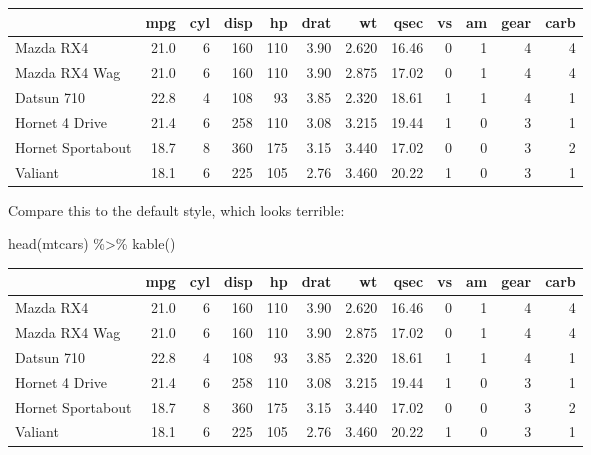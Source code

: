 \documentclass[a4paper, nobind]{templates/ociamthesis}
\newenvironment{Shaded}{\begin{snugshade}}{\end{snugshade}}
\newcommand{\FunctionTok}[1]{\textcolor[rgb]{0.00,0.00,0.00}{#1}}
\newcommand{\NormalTok}[1]{#1}
\newcommand{\SpecialCharTok}[1]{\textcolor[rgb]{0.00,0.00,0.00}{#1}}
\renewenvironment{Shaded}
{
  \vspace{10pt}%
  \begin{snugshade}%
}{%
  \end{snugshade}%
  \vspace{8pt}%
}
\begin{document}
\begin{tabular}{lrrrrrrrrrrr}
\toprule
  & mpg & cyl & disp & hp & drat & wt & qsec & vs & am & gear & carb\\
\midrule
Mazda RX4 & 21.0 & 6 & 160 & 110 & 3.90 & 2.620 & 16.46 & 0 & 1 & 4 & 4\\
Mazda RX4 Wag & 21.0 & 6 & 160 & 110 & 3.90 & 2.875 & 17.02 & 0 & 1 & 4 & 4\\
Datsun 710 & 22.8 & 4 & 108 & 93 & 3.85 & 2.320 & 18.61 & 1 & 1 & 4 & 1\\
Hornet 4 Drive & 21.4 & 6 & 258 & 110 & 3.08 & 3.215 & 19.44 & 1 & 0 & 3 & 1\\
Hornet Sportabout & 18.7 & 8 & 360 & 175 & 3.15 & 3.440 & 17.02 & 0 & 0 & 3 & 2\\
\addlinespace
Valiant & 18.1 & 6 & 225 & 105 & 2.76 & 3.460 & 20.22 & 1 & 0 & 3 & 1\\
\bottomrule
\end{tabular}

\vspace{4mm}

Compare this to the default style, which looks terrible:

\begin{Shaded}
\begin{Highlighting}[]
\FunctionTok{head}\NormalTok{(mtcars) }\SpecialCharTok{\%\textgreater{}\%} 
  \FunctionTok{kable}\NormalTok{()}
\end{Highlighting}
\end{Shaded}

\begin{tabular}{l|r|r|r|r|r|r|r|r|r|r|r}
\hline
  & mpg & cyl & disp & hp & drat & wt & qsec & vs & am & gear & carb\\
\hline
Mazda RX4 & 21.0 & 6 & 160 & 110 & 3.90 & 2.620 & 16.46 & 0 & 1 & 4 & 4\\
\hline
Mazda RX4 Wag & 21.0 & 6 & 160 & 110 & 3.90 & 2.875 & 17.02 & 0 & 1 & 4 & 4\\
\hline
Datsun 710 & 22.8 & 4 & 108 & 93 & 3.85 & 2.320 & 18.61 & 1 & 1 & 4 & 1\\
\hline
Hornet 4 Drive & 21.4 & 6 & 258 & 110 & 3.08 & 3.215 & 19.44 & 1 & 0 & 3 & 1\\
\hline
Hornet Sportabout & 18.7 & 8 & 360 & 175 & 3.15 & 3.440 & 17.02 & 0 & 0 & 3 & 2\\
\hline
Valiant & 18.1 & 6 & 225 & 105 & 2.76 & 3.460 & 20.22 & 1 & 0 & 3 & 1\\
\hline
\end{tabular}
\end{document}
